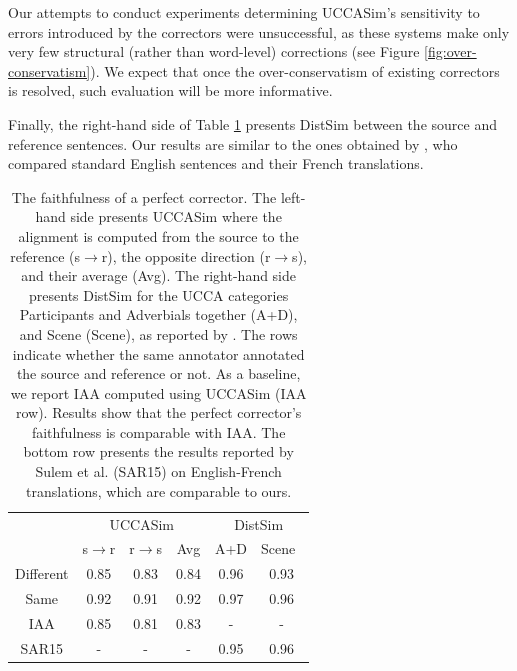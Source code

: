 \documentclass[letter,11pt]{article}
\begin{document}
Our attempts to conduct experiments determining {\sc UCCASim}'s sensitivity to
errors introduced by the correctors were
unsuccessful, as these systems make only very few structural (rather than word-level)
corrections (see Figure \ref{fig:over-conservatism}).
We expect that once the over-conservatism of existing correctors is resolved,
such evaluation will be more informative.
%

Finally, the right-hand side of Table \ref{tab:Distances} presents {\sc DistSim}
between the source and reference sentences.
Our results are similar to the ones obtained by ,
who compared standard English sentences and their French translations.
\begin{table}
	\vspace{-0.5cm}
  \small
  \centering
  \singlespacing
  \begin{tabular}{c|c|c|c||c|c|}
  	\cline{2-6} 
  	& \multicolumn{3}{c||}{\sc UCCASim} & \multicolumn{2}{c|}{\sc DistSim}\\ \cline{2-6}
  	& s$\rightarrow$r & r$\rightarrow$s & Avg & A+D & Scene\
    \\
    \hline
    Different & 0.85 & 0.83 & 0.84 & 0.96 & 0.93
    \\
    Same & 0.92 & 0.91 & 0.92 & 0.97 & 0.96
    \\
    \hline
    \hline
    IAA & 0.85 & 0.81 & 0.83 & - & -
    \\
    \hline
    SAR15 & - & - & - & 0.95 & 0.96 \\
    \hline
  \end{tabular}
  \caption{\label{tab:Distances}
    The faithfulness of a perfect corrector. The left-hand side presents {\sc UCCASim}
    where the alignment is computed from the source to the reference (s$\rightarrow$r), the opposite direction
    (r$\rightarrow$s), and their average (Avg).
    The right-hand side presents {\sc DistSim} for the UCCA categories Participants and Adverbials
    together (A+D), and Scene (Scene), as reported by \newcite{sulem2015conceptual}.
    The rows indicate whether the same annotator annotated the source and reference or not. As a baseline, we report IAA computed using {\sc UCCASim} (IAA row).
    Results show that the perfect corrector's faithfulness is comparable with IAA.
    The bottom row presents the results reported by Sulem et al. (SAR15) on English-French
    translations, which are comparable to ours.}
\vspace{-0.6cm}
\end{table}
\end{document}
